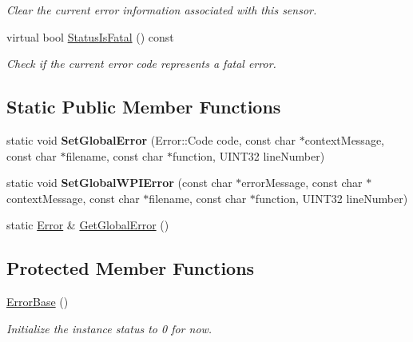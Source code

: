 \begin{DoxyCompactItemize}
\begin{DoxyCompactList}\small\item\em Clear the current error information associated with this sensor. \end{DoxyCompactList}\item 
virtual bool \hyperlink{classErrorBase_a05790f219c9e436a09752f73f7344024}{StatusIsFatal} () const 
\begin{DoxyCompactList}\small\item\em Check if the current error code represents a fatal error. \end{DoxyCompactList}\end{DoxyCompactItemize}
\subsection*{Static Public Member Functions}
\begin{DoxyCompactItemize}
\item 
\hypertarget{classErrorBase_ab1a827a11e8c3ba905ef88cac9583c4f}{
static void {\bfseries SetGlobalError} (Error::Code code, const char $\ast$contextMessage, const char $\ast$filename, const char $\ast$function, UINT32 lineNumber)}
\label{classErrorBase_ab1a827a11e8c3ba905ef88cac9583c4f}

\item 
\hypertarget{classErrorBase_a3cc8960dee0edd4b57b494aa139e5887}{
static void {\bfseries SetGlobalWPIError} (const char $\ast$errorMessage, const char $\ast$contextMessage, const char $\ast$filename, const char $\ast$function, UINT32 lineNumber)}
\label{classErrorBase_a3cc8960dee0edd4b57b494aa139e5887}

\item 
static \hyperlink{classError}{Error} \& \hyperlink{classErrorBase_ab85de5de437f0293356753b2ebab874c}{GetGlobalError} ()
\end{DoxyCompactItemize}
\subsection*{Protected Member Functions}
\begin{DoxyCompactItemize}
\item 
\hypertarget{classErrorBase_af49991441156c7832d7017951427cef2}{
\hyperlink{classErrorBase_af49991441156c7832d7017951427cef2}{ErrorBase} ()}
\label{classErrorBase_af49991441156c7832d7017951427cef2}

\begin{DoxyCompactList}\small\item\em Initialize the instance status to 0 for now. \end{DoxyCompactList}\end{DoxyCompactItemize}
